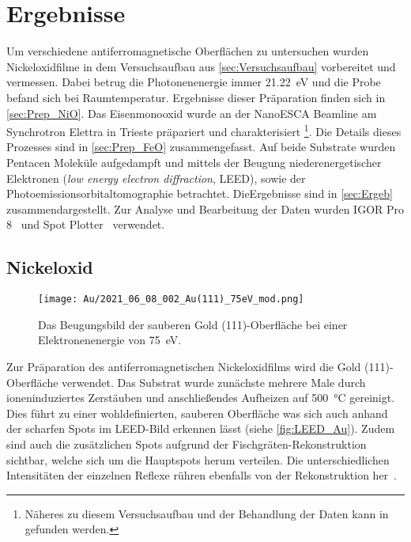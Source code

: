 \chapter{Ergebnisse}
    Um verschiedene antiferromagnetische Oberflächen zu untersuchen wurden Nickeloxidfilme in dem Versuchsaufbau aus \autoref{sec:Versuchsaufbau} vorbereitet und vermessen.
    Dabei betrug die Photonenenergie immer \SI{21.22}{\electronvolt} und die Probe befand sich bei Raumtemperatur.
    Ergebnisse dieser Präparation finden sich in \autoref{sec:Prep_NiO}.
    Das Eisenmonooxid wurde an der NanoESCA Beamline am Synchrotron Elettra in Trieste präpariert und charakterisiert \footnote{Näheres zu diesem Versuchsaufbau und der Behandlung der Daten kann in~\cite{ma-DJ} gefunden werden.}.
    Die Details dieses Prozesses sind in \autoref{sec:Prep_FeO} zusammengefasst.
    Auf beide Substrate wurden Pentacen Moleküle aufgedampft und mittels der Beugung niederenergetischer Elektronen (\textit{low energy electron diffraction}, LEED), sowie der Photoemissionsorbitaltomographie betrachtet.
    DieErgebnisse sind in \autoref{sec:Ergeb} zusammendargestellt.
    Zur Analyse und Bearbeitung der Daten wurden IGOR Pro 8~\cite{IGOR} und Spot Plotter~\cite{SpotPlotter} verwendet. %

    \section{Nickeloxid} \label{sec:Prep_NiO}
        \begin{figure}
            \centering
            \texttt{[image: Au/2021\_06\_08\_002\_Au(111)\_75eV\_mod.png]}            
            \caption{Das Beugungsbild der sauberen Gold (111)-Oberfläche bei einer Elektronenenergie von \SI{75}{\electronvolt}.}
            \label{fig:LEED_Au}
        \end{figure}
        Zur Präparation des antiferromagnetischen Nickeloxidfilms wird die Gold (111)-Oberfläche verwendet.
        Das Substrat wurde zunächste mehrere Male durch ioneninduziertes Zerstäuben und anschließendes Aufheizen auf \SI{500}{\celsius} gereinigt.
        Dies führt zu einer wohldefinierten, sauberen Oberfläche was sich auch anhand der scharfen Spots im LEED-Bild erkennen lässt (siehe \autoref{fig:LEED_Au}).
        Zudem sind auch die zusätzlichen Spots aufgrund der Fischgräten-Rekonstruktion sichtbar, welche sich um die Hauptspots herum verteilen.
        Die unterschiedlichen Intensitäten der einzelnen Reflexe rühren ebenfalls von der Rekonstruktion her~\cite{haag_epitaxial_2016}.

